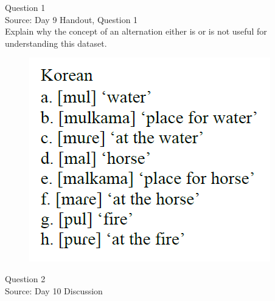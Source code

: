 \documentclass[12pt]{article}
\begin{document}
\begin{center}
\textbf{{\color{violet}{\HUGE Tuesday, 23 June 2020\\}}}

\textbf{{\color{violet}{\HUGE ALL EXAMS\\}}}

\end{center}
\newpage

\begin{center}
\textbf{{\color{blue}{\HUGE START OF EXAM\\}}}

\textbf{{\color{blue}{\HUGE Student ID: 6745\\}}}

\textbf{{\color{blue}{\HUGE 9:30 - 9:50 AM\\}}}

\end{center}
\newpage

{\large Question 1}\\

Source: Day 9 Handout, Question 1\\

Explain why the concept of an alternation either is or is not useful for understanding this dataset.\\

\begin{figure}[H]
\includegraphics{../images/korean.png}
\end{figure}

\newpage

{\large Question 2}\\

Source: Day 10 Discussion\\
\end{document}
